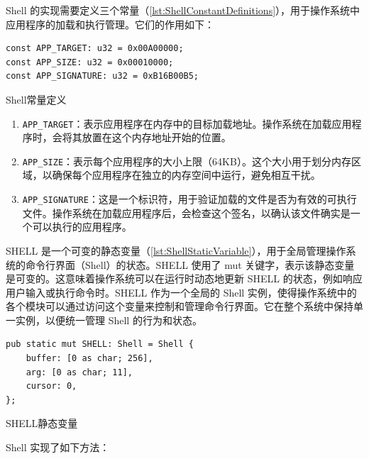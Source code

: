 Shell 的实现需要定义三个常量（\cref{lst:ShellConstantDefinitions}），用于操作系统中应用程序的加载和执行管理。它们的作用如下：

\begin{listing}[htbp]
    \begin{verbatim}
const APP_TARGET: u32 = 0x00A00000;
const APP_SIZE: u32 = 0x00010000;
const APP_SIGNATURE: u32 = 0xB16B00B5;
    \end{verbatim}
    \caption{Shell常量定义}\label{lst:ShellConstantDefinitions}
\end{listing}

\begin{enumerate}
    \item \texttt{APP\_TARGET}：表示应用程序在内存中的目标加载地址。操作系统在加载应用程序时，会将其放置在这个内存地址开始的位置。
    \item \texttt{APP\_SIZE}：表示每个应用程序的大小上限（64KB）。这个大小用于划分内存区域，以确保每个应用程序在独立的内存空间中运行，避免相互干扰。
    \item \texttt{APP\_SIGNATURE}：这是一个标识符，用于验证加载的文件是否为有效的可执行文件。操作系统在加载应用程序后，会检查这个签名，以确认该文件确实是一个可以执行的应用程序。
\end{enumerate}

SHELL 是一个可变的静态变量（\cref{lst:ShellStaticVariable}），用于全局管理操作系统的命令行界面（Shell）的状态。SHELL 使用了 mut 关键字，表示该静态变量是可变的。这意味着操作系统可以在运行时动态地更新 SHELL 的状态，例如响应用户输入或执行命令时。SHELL 作为一个全局的 Shell 实例，使得操作系统中的各个模块可以通过访问这个变量来控制和管理命令行界面。它在整个系统中保持单一实例，以便统一管理 Shell 的行为和状态。

\begin{listing}[htbp]
    \begin{verbatim}
pub static mut SHELL: Shell = Shell {
    buffer: [0 as char; 256],
    arg: [0 as char; 11],
    cursor: 0,
};
    \end{verbatim}
    \caption{SHELL静态变量}\label{lst:ShellStaticVariable}
\end{listing}

Shell 实现了如下方法：

